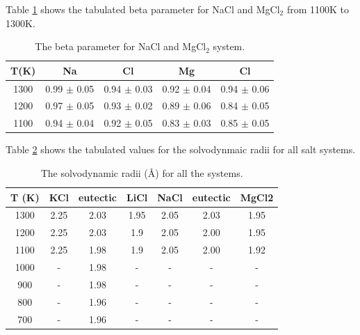 \documentclass[review]{elsarticle}
\begin{document}
Table \ref{table:nacl_and_mgcl2-beta} shows the tabulated beta parameter for NaCl and MgCl$_2$ from 1100K to 1300K. 
\begin{table}[h!]
\centering
\caption{The beta parameter for NaCl and MgCl$_2$ system. }
\begin{tabular}{|c|cc|cc|}
\hline
T(K) & Na          & Cl          & Mg          & Cl          \\
\hline
1300 & 0.99 $\pm$ 0.05 & 0.94 $\pm$ 0.03 & 0.92 $\pm$ 0.04 & 0.94 $\pm$ 0.06 \\
1200 & 0.97 $\pm$ 0.05 & 0.93 $\pm$ 0.02 & 0.89 $\pm$ 0.06 & 0.84 $\pm$ 0.05 \\
1100 & 0.94 $\pm$ 0.04 & 0.92 $\pm$ 0.05 & 0.83 $\pm$ 0.03 & 0.85 $\pm$ 0.05 \\
\hline
\end{tabular}
\label{table:nacl_and_mgcl2-beta}
\end{table} 
Table \ref{Table:solvodynamic} shows the tabulated values for the solvodynmaic radii for all salt systems.
\begin{table}[]
\centering
\caption{The solvodynamic radii (\AA) for all the systems.}
\begin{tabular}{|c|ccc|ccc|}
\hline
T (K) & KCl  & eutectic & LiCl & NaCl & eutectic & MgCl2 \\
\hline
1300  & 2.25 & 2.03     & 1.95 & 2.05 & 2.03     & 1.95  \\
1200  & 2.25 & 2.03     & 1.9  & 2.05 & 2.00     & 1.95  \\
1100  & 2.25 & 1.98     & 1.9  & 2.05 & 2.00     & 1.92  \\
1000  &   -   & 1.98     &  -    &  -    &     -     &   -    \\
900   &   -   & 1.98     &  -    &  -    &     -     &   -    \\
800   &   -   & 1.96     &  -    &  -    &     -     &   -    \\
700   &   -   & 1.96     &  -    &  -    &     -     &   -   \\
\hline
\end{tabular}
\label{Table:solvodynamic}
\end{table}
\FloatBarrier

\end{document}
